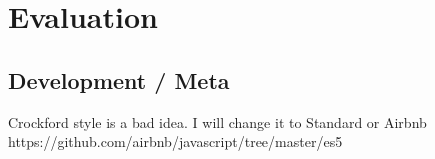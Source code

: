 \chapter{Evaluation}
\section{Development / Meta}
Crockford style is a bad idea. I will change it to Standard or Airbnb https://github.com/airbnb/javascript/tree/master/es5